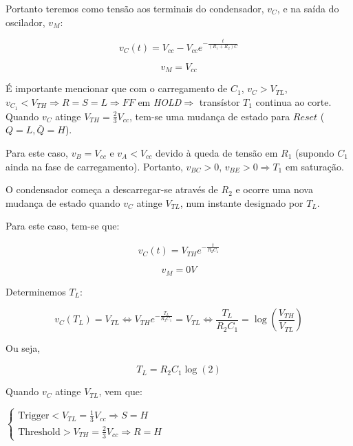 \documentclass[a4paper,11pt]{report}
\begin{document}
Portanto teremos como tensão aos terminais do condensador, $v_{C}$, e na saída do oscilador, $v_M$:

\begin{equation}
v_C(t)=V_{cc}-V_{cc}e^{-\frac{t}{\left(R_1+R_2\right)C}}
\end{equation}

\begin{equation}
 v_M=V_{cc}
\end{equation}

É importante mencionar que com o carregamento de $C_1$, $v_C>V_{TL}$, $v_{C_1}<V_{TH}\Rightarrow R=S=L\Rightarrow FF$ em \textit{HOLD}$\Rightarrow$ transístor $T_1$ continua ao corte.\\


Quando $v_C$ atinge $V_{TH}=\frac{2}{3}V_{cc}$, tem-se uma mudança de estado para $Reset$ ($Q=L,\bar{Q}=H$).

Para este caso, $v_B=V_{cc}$ e $v_A<V_{cc}$ devido à queda de tensão em $R_1$ (supondo $C_1$ ainda na fase de carregamento). Portanto, $v_{BC}>0$, $v_{BE}>0\Rightarrow T_1$ em saturação.

O condensador começa a descarregar-se através de $R_2$ e ocorre uma nova mudança de estado quando $v_C$ atinge $V_{TL}$, num instante designado por $T_L$.

Para este caso, tem-se que:

\begin{equation}
v_{C}(t)=V_{TH}e^{-\frac{t}{R_2C_1}}
\end{equation}


\begin{equation}
v_M=0 V
\end{equation}

Determinemos $T_L$:

$$v_C(T_L)=V_{TL}\Leftrightarrow V_{TH}e^{-\frac{T_L}{R_2C_1}}=V_{TL}\Leftrightarrow \frac{T_L}{R_2C_1}=\log{\left(\frac{V_{TH}}{V_{TL}}\right)}$$

Ou seja,

\begin{equation}
T_L=R_2C_1\log(2)
\end{equation}

Quando $v_C$ atinge $V_{TL}$, vem que:

\begin{center}
$
\begin{cases}
\text{Trigger}<V_{TL}=\frac{1}{3}V_{cc}\Rightarrow S=H\\
\text{Threshold}>V_{TH}=\frac{2}{3}V_{cc}\Rightarrow R=H
\end{cases}
$
\end{center}
\end{document}
